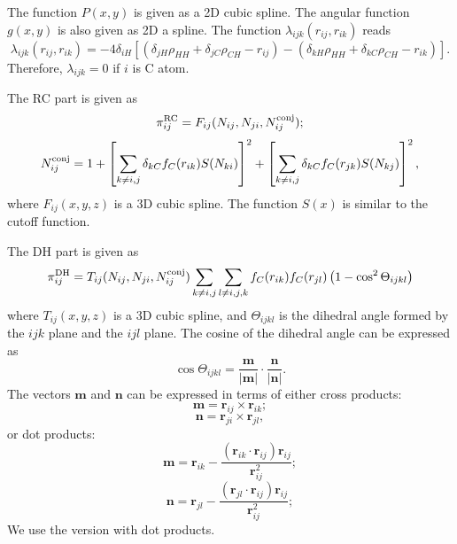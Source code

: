 \documentclass[12pt,a4paper]{report}
\newcommand{\vect}[1]{\boldsymbol{#1}}
\begin{document}
The function $P(x,y)$ is given as a 2D cubic spline. The angular function $g(x,y)$  is also given as 2D a spline. 
The function $\lambda_{ijk}(r_{ij},r_{ik})$ reads
\begin{equation}
\lambda_{ijk}(r_{ij},r_{ik}) =- 4\delta_{iH} 
\left[
  (\delta_{jH}\rho_{HH} + \delta_{jC}\rho_{CH} - r_{ij}) -
  (\delta_{kH}\rho_{HH} + \delta_{kC}\rho_{CH} - r_{ik})
\right].
\end{equation}
Therefore, $\lambda_{ijk}=0$ if $i$ is C atom.

The RC part is given as
\begin{equation}
\pi_{ij}^{\rm RC} = F_{ij}(N_{ij},N_{ji},N_{ij}^{\rm conj});
\end{equation}
\begin{equation}
N_{ij}^{\rm conj} = 1 + 
\left[ \sum_{k\neq i,j} \delta_{kC} f_C(r_{ik}) S(N_{ki})\right]^2 +
\left[ \sum_{k\neq i,j} \delta_{kC} f_C(r_{jk}) S(N_{kj})\right]^2,
\end{equation}
where $F_{ij}(x,y,z)$ is a 3D cubic spline.  The function $S(x)$ is similar to the cutoff function.

The DH part is given as
\begin{equation}
\pi_{ij}^{\rm DH} =T_{ij}(N_{ij},N_{ji},N_{ij}^{\rm conj}) 
\sum_{k\neq i,j}\sum_{l\neq i,j,k} f_{C}(r_{ik}) f_{C}(r_{jl})\left(1-\cos^2\Theta_{ijkl}\right)
\end{equation}
where $T_{ij}(x,y,z)$ is a 3D cubic spline, and $\Theta_{ijkl}$ is the dihedral angle formed by the $ijk$ plane and the $ijl$ plane. The cosine of the dihedral angle can be expressed as
\begin{equation}
\cos\Theta_{ijkl} = 
\frac{ \vect{m} } {|  \vect{m} |}
\cdot 
\frac{  \vect{n} } {|  \vect{n} |}.
\end{equation}
The vectors  $\vect{m}$ and  $\vect{n}$ can be expressed in terms of either cross products:
\begin{equation}
\vect{m} = \vect{r}_{ij} \times \vect{r}_{ik};
\end{equation}
\begin{equation}
\vect{n} = \vect{r}_{ji} \times \vect{r}_{jl},
\end{equation}
or dot products:
\begin{equation}
\vect{m} = \vect{r}_{ik} - \frac{(\vect{r}_{ik} \cdot \vect{r}_{ij}) \vect{r}_{ij} }{\vect{r}_{ij}^2};
\end{equation}
\begin{equation}
\vect{n} = \vect{r}_{jl} - \frac{(\vect{r}_{jl} \cdot \vect{r}_{ij}) \vect{r}_{ij} }{\vect{r}_{ij}^2};
\end{equation}
We use the version with dot products.
\end{document}
